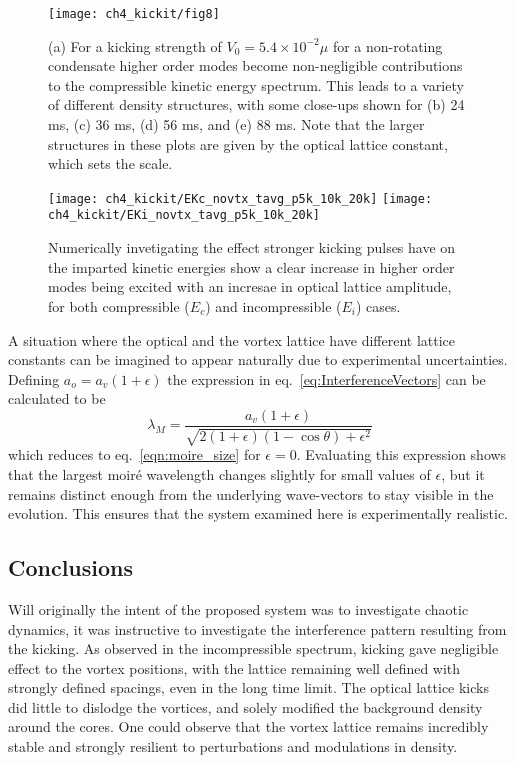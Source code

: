 \begin{figure}[tb]
    \centering
	\texttt{[image: ch4\_kickit/fig8]}
	\caption{(a) For a kicking strength of $V_0 = 5.4\times10^{-2}\mu$ for a non-rotating condensate higher order modes become non-negligible contributions to the compressible kinetic energy spectrum. This leads to a variety of different density structures, with some close-ups shown for (b) 24 ms, (c) 36 ms, (d) 56 ms, and (e) 88 ms. Note that the larger structures in these plots are given by the optical lattice constant, which sets the scale.}
	\label{fig:kickp20k}
\end{figure}
\begin{figure}[tb]
    \centering
    \texttt{[image: ch4\_kickit/EKc\_novtx\_tavg\_p5k\_10k\_20k]}
    \texttt{[image: ch4\_kickit/EKi\_novtx\_tavg\_p5k\_10k\_20k]}
	\caption{Numerically invetigating the effect stronger kicking pulses have on the imparted kinetic energies show a clear increase in higher order modes being excited with an incresae in optical lattice amplitude, for both compressible ($E_c$) and incompressible ($E_i$) cases.}\label{fig:kick_compare_spec}
\end{figure}

    A situation where the optical and the vortex lattice have different lattice constants can be imagined to appear naturally due to experimental uncertainties. Defining $a_o = a_v(1+\epsilon)$ the expression in eq.~\eqref{eq:InterferenceVectors} can be calculated to be
    \begin{equation}
    	\lambda_M = \frac{a_v(1+\epsilon)}{\sqrt{2(1+\epsilon)(1-\cos\theta) + \epsilon^2}}
    	\label{eqn:moire_size_eps}
    \end{equation}
    which reduces to eq.~\eqref{eqn:moire_size} for $\epsilon=0$. Evaluating this expression shows that the largest moir\'e wavelength changes slightly for small values of $\epsilon$, but it remains distinct enough from the underlying wave-vectors to stay visible in the evolution. This ensures that the system examined here is experimentally realistic.

\subsection{Conclusions}
\label{subs:ch4_conc}
Will originally the intent of the proposed system was to investigate chaotic dynamics, it was instructive to investigate the interference pattern resulting from the kicking. As observed in the incompressible spectrum, kicking gave negligible effect to the vortex positions, with the lattice remaining well defined with strongly defined spacings, even in the long time limit. The optical lattice kicks did little to dislodge the vortices, and solely modified the background density around the cores. One could observe that the vortex lattice remains incredibly stable and strongly resilient to perturbations and modulations in density.

